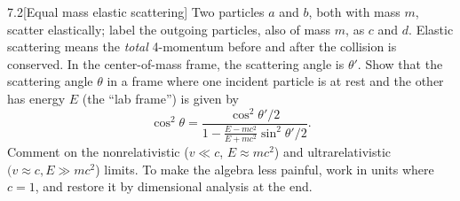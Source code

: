 \documentclass[12pt]{article}
\begin{document}
\begin{problem}{7.2}[Equal mass elastic scattering]
Two particles $a$ and $b$, both with mass $m$, scatter elastically; label the
outgoing particles, also of mass $m$, as $c$ and $d$. Elastic scattering means
the \textit{total} 4-momentum before and after the collision is conserved. In
the center-of-mass frame, the scattering angle is $\theta'$. Show that the
scattering angle $\theta$ in a frame where one incident particle is at rest and
the other has energy $E$ (the ``lab frame'') is given by
\begin{equation}
    \cos^2\theta=\frac{\cos^2\theta'/2}{1-\frac{E-mc^2}{E+mc^2}\sin^2\theta'/2}.
\end{equation}
Comment on the nonrelativistic ($v\ll c$, $E\approx mc^2$) and ultrarelativistic
$(v\approx c,E\gg mc^2$) limits. To make the algebra less painful, work in units
where $c=1$, and restore it by dimensional analysis at the end.


\end{problem}
\end{document}
